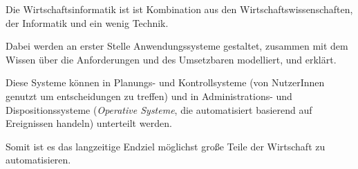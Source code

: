 \documentclass{article}
\begin{document}
Die Wirtschaftsinformatik ist ist Kombination aus den Wirtschaftswissenschaften, der Informatik und ein wenig Technik.

Dabei werden an erster Stelle Anwendungssysteme gestaltet, zusammen mit dem Wissen über die Anforderungen und des Umsetzbaren modelliert, und erklärt.

Diese Systeme können in Planungs- und Kontrollsysteme (von NutzerInnen genutzt um entscheidungen zu treffen) und in Administrations- und Dispositionssysteme (\emph{Operative Systeme}, die automatisiert basierend auf Ereignissen handeln) unterteilt werden.

Somit ist es das langzeitige Endziel möglichst große Teile der Wirtschaft zu automatisieren.

\end{document}
